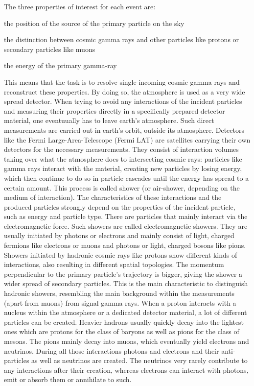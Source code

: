 The three properties of interest for each event are:
%
\begin{description}[labelsep=1em, align=right]
  \item[source position]{the position of the source of the primary particle on the sky}
  \item[particle type]{the distinction between cosmic gamma rays and other particles like protons or secondary particles like muons}
  \item[particle energy]{the energy of the primary gamma-ray}
\end{description}
%
This means that the task is to resolve single incoming cosmic gamma rays and
reconstruct these properties. By doing so, the atmosphere is used as a very
wide spread detector. When trying to avoid any interactions of the incident
particles and measuring their properties directly in a specifically prepared
detector material, one eventuually has to leave earth's atmosphere. Such direct
measurements are carried out in earth's orbit, outside its atmosphere.
Detectors like the Fermi Large-Area-Telescope \cite{fermiLAT} (Fermi LAT) are satellites
carrying their own detectors for the necessary measurements. They consist of
interaction volumes taking over what the atmosphere does to intersecting cosmic
rays: particles like gamma rays interact with the material, creating new
particles by losing energy, which then continue to do so in particle cascades
until the energy has spread to a certain amount. This process is called
shower (or air-shower, depending on the medium of interaction). The
characteristics of these interactions and the produced particles strongly
depend on the properties of the incident particle, such as energy and particle
type. There are particles that mainly interact via the electromagnetic force.
Such showers are called electromagnetic showers. They are usually initiated by
photons or electrons and mainly consist of light, charged fermions like electrons or
muons and photons or light, charged bosons like pions. Showers initiated by
hadronic cosmic rays like protons show different kinds of interactions, also
resulting in different spatial topologies. The momentum perpendicular to the
primary particle's trajectory is bigger, giving the shower a wider spread of
secondary particles. This is the main characteristic to distinguish hadronic
showers, resembling the main background within the measurements (apart from
muons) from signal gamma rays. When a proton interacts with a
nucleus within the atmosphere or a dedicated detector material, a lot of
different particles can be created. Heavier hadrons usually quickly decay into
the lightest ones which are protons for the class of baryons as well as pions
for the class of mesons. The pions mainly decay into muons, which eventually
yield electrons and neutrinos. During all those interactions photons and
electrons and their anti-particles as well as neutrinos are created. The
neutrinos very rarely contribute to any interactions after their creation,
whereas electrons can interact with photons, emit or absorb them or annihilate
to such.


